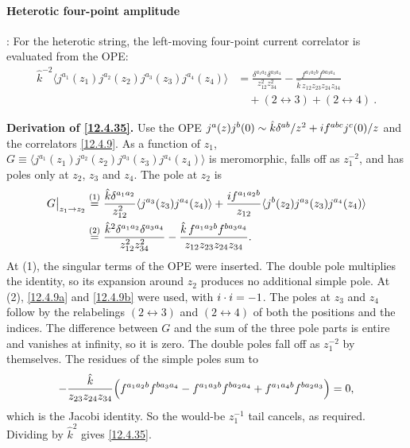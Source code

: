\paragraph*{Heterotic four-point amplitude}: For the heterotic string, the left-moving four-point current correlator is evaluated from the OPE:
\begin{align}
	\hat{k}^{-2}\langle j^{a_{1}}(z_{1})j^{a_{2}}(z_{2})j^{a_{3}}(z_{3})j^{a_{4}}(z_{4})\rangle &= \frac{\delta^{a_{1}a_{2}}\delta^{a_{3}a_{4}}}{z_{12}^{2}z_{34}^{2}} - \frac{f^{a_{1}a_{2}b}f^{b a_{3}a_{4}}}{\hat{k}\,z_{12}z_{23}z_{24}z_{34}} \nonumber \\
	&\quad + (2\leftrightarrow 3) + (2\leftrightarrow 4) \:. \label{12.4.35}
\end{align}
\begin{tcolorbox}[breakable]
	\begin{remark}
		\textbf{Derivation of \eqref{12.4.35}.} Use the OPE $j^{a}(z)j^{b}(0)\sim\hat k\delta^{ab}/z^{2}+i f^{abc}j^{c}(0)/z$ and the correlators \eqref{12.4.9}. As a function of $z_{1}$, $G\equiv\langle j^{a_1}(z_{1})j^{a_2}(z_{2})j^{a_3}(z_{3})j^{a_4}(z_{4})\rangle$ is meromorphic, falls off as $z_{1}^{-2}$, and has poles only at $z_{2}$, $z_{3}$ and $z_{4}$. The pole at $z_{2}$ is
		\begin{align*}
			G\big|_{z_{1}\to z_{2}}
			&\overset{(1)}{=} \frac{\hat k\delta^{a_1a_2}}{z_{12}^{2}}\langle j^{a_3}(z_{3})j^{a_4}(z_{4})\rangle+\frac{i f^{a_1a_2b}}{z_{12}}\langle j^{b}(z_{2})j^{a_3}(z_{3})j^{a_4}(z_{4})\rangle\\
			&\overset{(2)}{=} \frac{\hat k^{2}\delta^{a_1a_2}\delta^{a_3a_4}}{z_{12}^{2}z_{34}^{2}}-\frac{\hat k\,f^{a_1a_2b}f^{ba_3a_4}}{z_{12}z_{23}z_{24}z_{34}} .
		\end{align*}
		At (1), the singular terms of the OPE were inserted. The double pole multiplies the identity, so its expansion around $z_{2}$ produces no additional simple pole. At (2), \eqref{12.4.9a} and \eqref{12.4.9b} were used, with $i\cdot i=-1$. The poles at $z_{3}$ and $z_{4}$ follow by the relabelings $(2\leftrightarrow3)$ and $(2\leftrightarrow4)$ of both the positions and the indices. The difference between $G$ and the sum of the three pole parts is entire and vanishes at infinity, so it is zero. The double poles fall off as $z_{1}^{-2}$ by themselves. The residues of the simple poles sum to
		\[
		-\frac{\hat k}{z_{23}z_{24}z_{34}}\Bigl(f^{a_1a_2b}f^{ba_3a_4}-f^{a_1a_3b}f^{ba_2a_4}+f^{a_1a_4b}f^{ba_2a_3}\Bigr)=0 ,
		\]
		which is the Jacobi identity. So the would-be $z_{1}^{-1}$ tail cancels, as required. Dividing by $\hat k^{2}$ gives \eqref{12.4.35}.
	\end{remark}
\end{tcolorbox}
